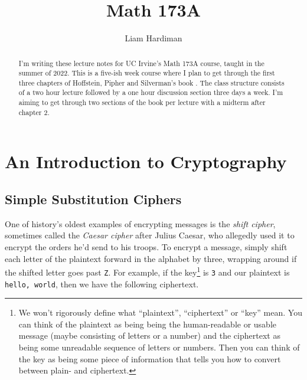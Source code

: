 \documentclass[12pt]{article}
\theoremstyle{plain}
\theoremstyle{definition}
\theoremstyle{remark}
\begin{document}
 
 
\title{Math 173A}
\author{Liam Hardiman}

\maketitle

\begin{abstract}
    I'm writing these lecture notes for UC Irvine's Math 173A course, taught in the summer of 2022.
    This is a five-ish week course where I plan to get through the first three chapters of Hoffstein, Pipher and Silverman's book \cite{HPS}.
    The class structure consists of a two hour lecture followed by a one hour discussion section three days a week.
    I'm aiming to get through two sections of the book per lecture with a midterm after chapter 2.

\end{abstract}


\tableofcontents


\section{An Introduction to Cryptography}
\subsection{Simple Substitution Ciphers}
One of history's oldest examples of encrypting messages is the \emph{shift cipher}, sometimes called the \emph{Caesar cipher} after Julius Caesar, who allegedly used it to encrypt the orders he'd send to his troops.
To encrypt a message, simply shift each letter of the plaintext forward in the alphabet by three, wrapping around if the shifted letter goes past \texttt{Z}. For example, if the key\footnote{We won't rigorously define what ``plaintext'', ``ciphertext'' or ``key'' mean. You can think of the plaintext as being being the human-readable or usable message (maybe consisting of letters or a number) and the ciphertext as being some unreadable sequence of letters or numbers. Then you can think of the key as being some piece of information that tells you how to convert between plain- and ciphertext.} is \texttt{3} and our plaintext is \texttt{hello, world}, then we have the following ciphertext.
\end{document}
